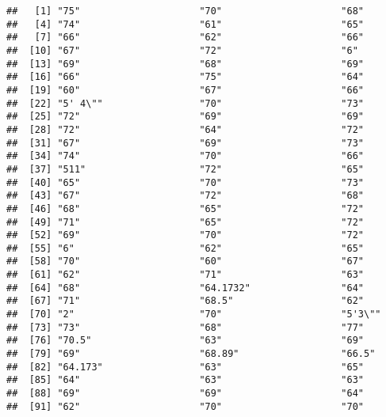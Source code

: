 \documentclass[
]{article}
\begin{document}
\begin{verbatim}
##   [1] "75"                     "70"                     "68"                    
##   [4] "74"                     "61"                     "65"                    
##   [7] "66"                     "62"                     "66"                    
##  [10] "67"                     "72"                     "6"                     
##  [13] "69"                     "68"                     "69"                    
##  [16] "66"                     "75"                     "64"                    
##  [19] "60"                     "67"                     "66"                    
##  [22] "5' 4\""                 "70"                     "73"                    
##  [25] "72"                     "69"                     "69"                    
##  [28] "72"                     "64"                     "72"                    
##  [31] "67"                     "69"                     "73"                    
##  [34] "74"                     "70"                     "66"                    
##  [37] "511"                    "72"                     "65"                    
##  [40] "65"                     "70"                     "73"                    
##  [43] "67"                     "72"                     "68"                    
##  [46] "68"                     "65"                     "72"                    
##  [49] "71"                     "65"                     "72"                    
##  [52] "69"                     "70"                     "72"                    
##  [55] "6"                      "62"                     "65"                    
##  [58] "70"                     "60"                     "67"                    
##  [61] "62"                     "71"                     "63"                    
##  [64] "68"                     "64.1732"                "64"                    
##  [67] "71"                     "68.5"                   "62"                    
##  [70] "2"                      "70"                     "5'3\""                 
##  [73] "73"                     "68"                     "77"                    
##  [76] "70.5"                   "63"                     "69"                    
##  [79] "69"                     "68.89"                  "66.5"                  
##  [82] "64.173"                 "63"                     "65"                    
##  [85] "64"                     "63"                     "63"                    
##  [88] "69"                     "69"                     "64"                    
##  [91] "62"                     "70"                     "70"                    

\end{verbatim}
\end{document}
